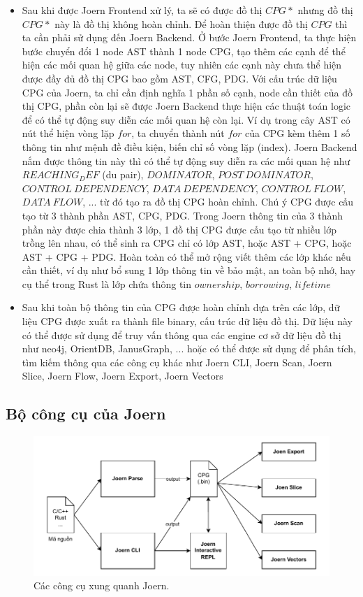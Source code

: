 \begin{itemize}
  \item Sau khi được Joern Frontend xử lý, ta sẽ có được đồ thị $CPG*$ nhưng đồ thị $CPG*$ này là đồ thị không hoàn chỉnh. Để hoàn thiện được đồ thị $CPG$ thì ta cần phải sử dụng đến Joern Backend. Ở bước Joern Frontend, ta thực hiện bước chuyển đổi 1 node AST thành 1 node CPG, tạo thêm các cạnh để thể hiện các mối quan hệ giữa các node, tuy nhiên các cạnh này chưa thể hiện được đầy đủ đồ thị CPG bao gồm AST, CFG, PDG. Với cấu trúc dữ liệu CPG của Joern, ta chỉ cần định nghĩa 1 phần số cạnh, node cần thiết của đồ thị CPG, phần còn lại sẽ được Joern Backend thực hiện các thuật toán logic để có thể tự động suy diễn các mối quan hệ còn lại. Ví dụ trong cây AST có nút thể hiện vòng lặp $for$, ta chuyển thành nút $for$ của CPG kèm thêm 1 số thông tin như mệnh đề điều kiện, biến chỉ số vòng lặp (index). Joern Backend nắm được thông tin này thì có thể tự động suy diễn ra các mối quan hệ như $REACHING_DEF$ (du pair), $DOMINATOR$, $POST\ DOMINATOR$, $CONTROL\ DEPENDENCY$, $DATA\ DEPENDENCY$, $CONTROL\ FLOW$, $DATA\ FLOW$, ... từ đó tạo ra đồ thị CPG hoàn chỉnh. Chú ý CPG được cấu tạo từ 3 thành phần AST, CPG, PDG. Trong Joern thông tin của 3 thành phần này được chia thành 3 lớp, 1 đồ thị CPG được cấu tạo từ nhiều lớp trồng lên nhau, có thể sinh ra CPG chỉ có lớp AST, hoặc AST + CPG, hoặc AST + CPG + PDG. Hoàn toàn có thể mở rộng viết thêm các lớp khác nếu cần thiết, ví dụ như bổ sung 1 lớp thông tin về bảo mật, an toàn bộ nhớ, hay cụ thể trong Rust là lớp chứa thông tin $ownership$, $borrowing$, $lifetime$
  \item Sau khi toàn bộ thông tin của CPG được hoàn chỉnh dựa trên các lớp, dữ liệu CPG được xuất ra thành file binary, cấu trúc dữ liệu đồ thị. Dữ liệu này có thể được sử dụng để truy vấn thông qua các engine cơ sở dữ liệu đồ thị như neo4j, OrientDB, JanusGraph, ... hoặc có thể được sử dụng để phân tích, tìm kiếm thông qua các công cụ khác như Joern CLI, Joern Scan, Joern Slice, Joern Flow, Joern Export, Joern Vectors
\end{itemize}

\subsection{Bộ công cụ của Joern}

\begin{figure}[H]
  \includegraphics[width=1\columnwidth]{figures/c2/c2_joern_tools.drawio.pdf}
  \centering
  \caption{Các công cụ xung quanh Joern.}
  \label{img:c2_joern_tools}
\end{figure}

